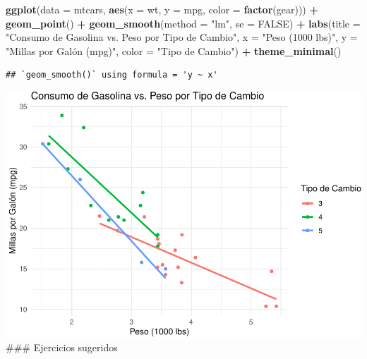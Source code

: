 \documentclass[
]{book}
\newenvironment{Shaded}{\begin{snugshade}}{\end{snugshade}}
\newcommand{\AttributeTok}[1]{\textcolor[rgb]{0.13,0.29,0.53}{#1}}
\newcommand{\ConstantTok}[1]{\textcolor[rgb]{0.56,0.35,0.01}{#1}}
\newcommand{\FunctionTok}[1]{\textcolor[rgb]{0.13,0.29,0.53}{\textbf{#1}}}
\newcommand{\NormalTok}[1]{#1}
\newcommand{\SpecialCharTok}[1]{\textcolor[rgb]{0.81,0.36,0.00}{\textbf{#1}}}
\newcommand{\StringTok}[1]{\textcolor[rgb]{0.31,0.60,0.02}{#1}}
\begin{document}
\begin{Shaded}
\begin{Highlighting}[]
\FunctionTok{ggplot}\NormalTok{(}\AttributeTok{data =}\NormalTok{ mtcars, }\FunctionTok{aes}\NormalTok{(}\AttributeTok{x =}\NormalTok{ wt, }\AttributeTok{y =}\NormalTok{ mpg, }\AttributeTok{color =} \FunctionTok{factor}\NormalTok{(gear))) }\SpecialCharTok{+} 
  \FunctionTok{geom\_point}\NormalTok{() }\SpecialCharTok{+}
  \FunctionTok{geom\_smooth}\NormalTok{(}\AttributeTok{method =} \StringTok{"lm"}\NormalTok{, }\AttributeTok{se =} \ConstantTok{FALSE}\NormalTok{) }\SpecialCharTok{+}
  \FunctionTok{labs}\NormalTok{(}\AttributeTok{title =} \StringTok{"Consumo de Gasolina vs. Peso por Tipo de Cambio"}\NormalTok{,}
       \AttributeTok{x =} \StringTok{"Peso (1000 lbs)"}\NormalTok{,}
       \AttributeTok{y =} \StringTok{"Millas por Galón (mpg)"}\NormalTok{,}
       \AttributeTok{color =} \StringTok{"Tipo de Cambio"}\NormalTok{) }\SpecialCharTok{+}
  \FunctionTok{theme\_minimal}\NormalTok{()}
\end{Highlighting}
\end{Shaded}

\begin{verbatim}
## `geom_smooth()` using formula = 'y ~ x'
\end{verbatim}

\includegraphics{bookdown-demo_files/figure-latex/unnamed-chunk-171-1.pdf}
\#\#\# Ejercicios sugeridos
\end{document}

